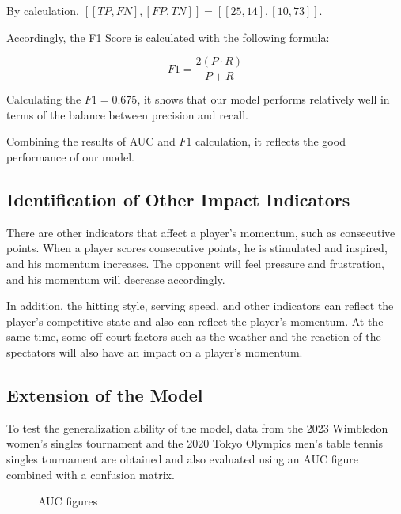 \documentclass[12pt]{article}  %
\begin{document}
By calculation, $[[TP, FN], [FP, TN]]=[[25, 14], [10, 73]]$.

Accordingly, the F1 Score is calculated with the following formula:

\begin{equation}
	F1=\frac{2(  P \cdot R )}{ P +  R}
\end{equation}

Calculating the $F1 = 0.675$, it shows that our model performs relatively well in terms of the balance between precision and recall.

Combining the results of AUC and $F1$ calculation, it reflects the good performance of our model.

\subsection{Identification of Other Impact Indicators}
There are other indicators that affect a player's momentum, such as consecutive points. When a player scores consecutive points, he is stimulated and inspired, and his momentum increases. The opponent will feel pressure and frustration, and his momentum will decrease accordingly.

In addition, the hitting style, serving speed, and other indicators can reflect the player's competitive state and also can reflect the player's momentum. At the same time, some off-court factors such as the weather and the reaction of the spectators will also have an impact on a player's momentum.

\subsection{Extension of the Model}
To test the generalization ability of the model, data from the 2023 Wimbledon women's singles tournament and the 2020 Tokyo Olympics men's table tennis singles tournament are obtained and also evaluated using an AUC figure combined with a confusion matrix.

	\begin{figure}[htbp]
	\centering
	
	\hfill 
	
	\caption{AUC figures}
	\label{pic18and19}
\end{figure}
\end{document}
